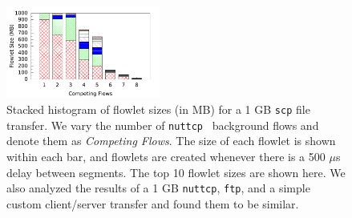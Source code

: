 \begin{figure}[t]
        \centering
  \includegraphics[width=0.45\textwidth]{presto/figures/flowlets/histo.pdf}
        \caption{Stacked histogram of flowlet sizes (in MB) for a 1 GB {\tt scp} file transfer. We vary the number of {\tt nuttcp}~\cite{nuttcp} background flows and
                denote them as {\em Competing Flows}. The size of each flowlet is shown within each bar, and flowlets
                are created whenever there is a 500 $\mu$s delay between segments. The top 10 flowlet sizes are shown here.
                We also analyzed the results of a 1 GB {\tt nuttcp}, {\tt ftp}, and a simple custom client/server transfer and found them
                to be similar. }
        \label{micro_flowlet_size}
\end{figure}



